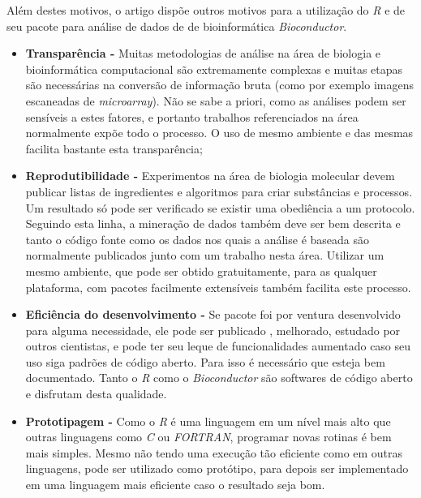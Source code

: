 Além destes motivos, o artigo \cite{bioconductor} dispõe outros motivos para a utilização do \emph{R} e de seu
pacote para análise de dados de de bioinformática \emph{Bioconductor}.

\begin{itemize}
  \item \textbf{Transparência -} Muitas metodologias de análise na área de biologia e bioinformática computacional
são extremamente complexas e muitas etapas são necessárias na conversão de informação bruta (como por exemplo imagens 
escaneadas de \emph{microarray}). Não se sabe a priori, como as análises podem ser sensíveis a estes fatores, e portanto
trabalhos referenciados na área normalmente expõe todo o processo. O uso de mesmo ambiente e das mesmas facilita bastante
esta transparência;
  \item \textbf{Reprodutibilidade -} Experimentos na área de biologia molecular devem publicar listas de ingredientes
e algoritmos para criar substâncias e processos. Um resultado só pode ser verificado se existir uma obediência a 
um protocolo. Seguindo esta linha, a mineração de dados também deve ser bem descrita e tanto o código fonte 
como os dados nos quais a análise é baseada são normalmente publicados junto com um trabalho nesta área. Utilizar
um mesmo ambiente, que pode ser obtido gratuitamente, para as qualquer plataforma, com pacotes 
facilmente extensíveis também facilita este processo.
  \item \textbf{Eficiência do desenvolvimento -} Se pacote foi por ventura desenvolvido para alguma necessidade, ele pode ser publicado
, melhorado, estudado por outros cientistas, e pode ter seu leque de funcionalidades aumentado caso seu uso siga padrões
de código aberto. Para isso é necessário que esteja bem documentado. Tanto o \emph{R} como o \emph{Bioconductor} são softwares
de código aberto e disfrutam desta qualidade.
  \item \textbf{Prototipagem -} Como o \emph{R} é uma linguagem em um nível mais alto que outras linguagens como \emph{C} ou
\emph{FORTRAN}, programar novas rotinas é bem mais simples. Mesmo não tendo uma execução tão eficiente como em outras
linguagens, pode ser utilizado como protótipo, para depois ser implementado em uma linguagem mais eficiente caso o 
resultado seja bom. 

\end{itemize}
